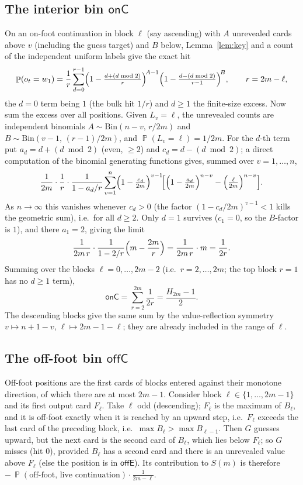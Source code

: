 \documentclass[11pt]{article}
\theoremstyle{definition}
\DeclareMathOperator{\PP}{\mathbb{P}}
\begin{document}
\subsection{The interior bin \texorpdfstring{$\mathsf{onC}$}{onC}}
On an on-foot continuation in block $\ell$ (say ascending) with $A$ unrevealed cards above $v$
(including the guess target) and $B$ below, Lemma~\ref{lem:key} and a count of the independent
uniform labels give the exact hit
\begin{equation}\label{eq:hit}
  \PP(o_{t}=w_1)=\frac1r\sum_{d=0}^{r-1}
  \Bigl(1-\tfrac{d+(d\bmod 2)}{r}\Bigr)^{\!A-1}\Bigl(1-\tfrac{d-(d\bmod 2)}{r-1}\Bigr)^{\!B},
  \qquad r=2m-\ell,
\end{equation}
the $d=0$ term being $1$ (the bulk hit $1/r$) and $d\ge1$ the finite-size excess. Now sum the
excess over all positions. Given $L_v=\ell$, the unrevealed counts are independent binomials
$A\sim\mathrm{Bin}(n-v,\,r/2m)$ and $B\sim\mathrm{Bin}(v-1,\,(r-1)/2m)$, and $\PP(L_v=\ell)=1/2m$.
For the $d$-th term put $a_d=d+(d\bmod2)$ (even, $\ge2$) and $c_d=d-(d\bmod2)$; a direct
computation of the binomial generating functions gives, summed over $v=1,\dots,n$,
\[
  \frac{1}{2m}\cdot\frac1r\cdot\frac{1}{1-a_d/r}\sum_{v=1}^{n}
  \Bigl(1-\tfrac{c_d}{2m}\Bigr)^{v-1}\!\Bigl[\Bigl(1-\tfrac{a_d}{2m}\Bigr)^{n-v}-\Bigl(\tfrac{\ell}{2m}\Bigr)^{n-v}\Bigr].
\]
As $n\to\infty$ this vanishes whenever $c_d>0$ (the factor $(1-c_d/2m)^{v-1}<1$ kills the
geometric sum), i.e.\ for all $d\ge2$. Only $d=1$ survives ($c_1=0$, so the $B$-factor is
$1$), and there $a_1=2$, giving the limit
\[
  \frac{1}{2m\,r}\cdot\frac{1}{1-2/r}\Bigl(m-\frac{2m}{r}\Bigr)=\frac{1}{2m\,r}\cdot m=\frac{1}{2r}.
\]
Summing over the blocks $\ell=0,\dots,2m-2$ (i.e.\ $r=2,\dots,2m$; the top block $r=1$ has no
$d\ge1$ term),
\[
  \mathsf{onC}=\sum_{r=2}^{2m}\frac{1}{2r}=\frac{H_{2m}-1}{2}.
\]
The descending blocks give the same sum by the value-reflection symmetry $v\mapsto n{+}1{-}v$,
$\ell\mapsto 2m{-}1{-}\ell$; they are already included in the range of $\ell$.

\subsection{The off-foot bin \texorpdfstring{$\mathsf{offC}$}{offC}}
Off-foot positions are the first cards of blocks entered against their monotone direction, of
which there are at most $2m-1$. Consider block $\ell\in\{1,\dots,2m-1\}$ and its first output
card $F_\ell$. Take $\ell$ odd (descending); $F_\ell$ is the maximum of $B_\ell$, and it is
off-foot exactly when it is reached by an upward step, i.e.\ $F_\ell$ exceeds the last card of
the preceding block, i.e.\ $\max B_\ell>\max B_{\ell-1}$. Then $G$ guesses upward, but the next
card is the second card of $B_\ell$, which lies below $F_\ell$; so $G$ misses (hit $0$),
provided $B_\ell$ has a second card and there is an unrevealed value above $F_\ell$ (else the
position is in $\mathsf{offE}$). Its contribution to $S(m)$ is therefore
$-\,\PP(\text{off-foot, live continuation})\cdot\frac{1}{2m-\ell}$.
\end{document}
